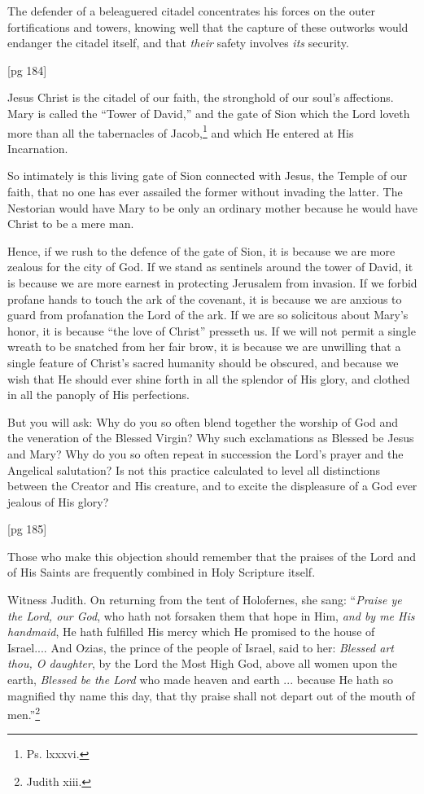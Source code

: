 The defender of a beleaguered citadel concentrates
his forces on the outer fortifications and
towers, knowing well that the capture of these
outworks would endanger the citadel itself, and
that \emph{their} safety involves \emph{its} security.

[pg 184]

Jesus Christ is the citadel of our faith, the
stronghold of our soul's affections. Mary is called
the “Tower of David,” and the gate of Sion which
the Lord loveth more than all the tabernacles of
Jacob,\footnote{Ps. lxxxvi.}
and which He entered at His Incarnation.

So intimately is this living gate of Sion connected
with Jesus, the Temple of our faith, that
no one has ever assailed the former without invading
the latter. The Nestorian would have
Mary to be only an ordinary mother because he
would have Christ to be a mere man.

Hence, if we rush to the defence of the gate of
Sion, it is because we are more zealous for the
city of God. If we stand as sentinels around the
tower of David, it is because we are more earnest
in protecting Jerusalem from invasion. If we
forbid profane hands to touch the ark of the covenant,
it is because we are anxious to guard from
profanation the Lord of the ark. If we are so solicitous
about Mary's honor, it is because “the
love of Christ” presseth us. If we will not permit
a single wreath to be snatched from her fair
brow, it is because we are unwilling that a single
feature of Christ's sacred humanity should be
obscured, and because we wish that He should
ever shine forth in all the splendor of His glory,
and clothed in all the panoply of His perfections.

But you will ask: Why do you so often blend
together the worship of God and the veneration
of the Blessed Virgin? Why such exclamations
as Blessed be Jesus and Mary? Why do you
so often repeat in succession the Lord's prayer
and the Angelical salutation? Is not this practice
calculated to level all distinctions between the
Creator and His creature, and to excite the displeasure
of a God ever jealous of His glory?

[pg 185]

Those who make this objection should remember
that the praises of the Lord and of His Saints
are frequently combined in Holy Scripture itself.

Witness Judith. On returning from the tent
of Holofernes, she sang: “\emph{Praise ye the Lord, our
God}, who hath not forsaken them that hope in
Him, \emph{and by me His handmaid}, He hath fulfilled
His mercy which He promised to the house of
Israel.... And Ozias, the prince of the people
of Israel, said to her: \emph{Blessed art thou, O daughter},
by the Lord the Most High God, above all
women upon the earth, \emph{Blessed be the Lord} who
made heaven and earth ... because He hath so
magnified thy name this day, that thy praise
shall not depart out of the mouth of men.”\footnote{Judith xiii.}

